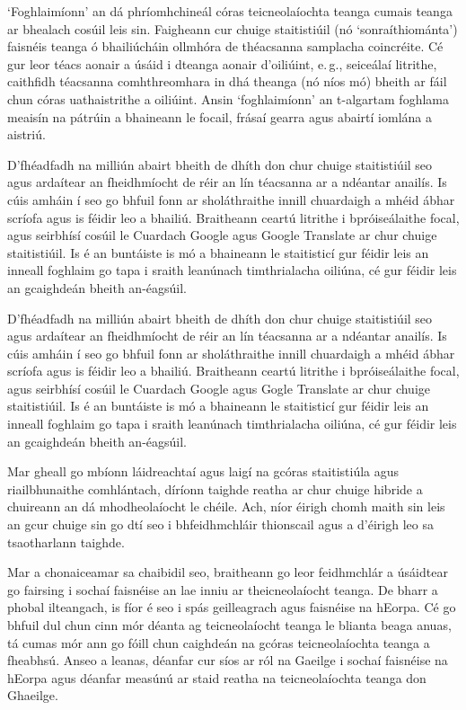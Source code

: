 \begin{multicols}{2}
`Foghlaimíonn' an dá phríomhchineál córas teicneolaíochta teanga cumais teanga ar bhealach cosúil leis sin. Faigheann cur chuige staitistiúil (nó ‘sonraíthiománta’) faisnéis teanga ó bhailiúcháin ollmhóra de théacsanna samplacha coincréite. Cé gur leor téacs aonair a úsáid i dteanga aonair d'oiliúint, e.\,g., seiceálaí litrithe, caithfidh téacsanna comhthreomhara in dhá theanga (nó níos mó) bheith ar fáil chun córas uathaistrithe a oiliúint. Ansin `foghlaimíonn' an t-algartam foghlama meaisín na pátrúin a bhaineann le focail, frásaí gearra agus abairtí iomlána a aistriú. 

D’fhéadfadh na milliún abairt bheith de dhíth don chur chuige staitistiúil seo agus ardaítear an fheidhmíocht de réir an lín téacsanna ar a ndéantar anailís. Is cúis amháin í seo go bhfuil fonn ar sholáthraithe innill chuardaigh a mhéid ábhar scríofa agus is féidir leo a bhailiú. Braitheann ceartú litrithe i bpróiseálaithe focal, agus seirbhísí cosúil le Cuardach Google agus Google Translate ar chur chuige staitistiúil. Is é an buntáiste is mó a bhaineann le staitisticí gur féidir leis an inneall foghlaim go tapa i sraith leanúnach timthrialacha oiliúna, cé gur féidir leis an gcaighdeán bheith an-éagsúil.

D’fhéadfadh na milliún abairt bheith de dhíth don chur chuige staitistiúil seo agus ardaítear an fheidhmíocht de réir an lín téacsanna ar a ndéantar anailís. Is cúis amháin í seo go bhfuil fonn ar sholáthraithe innill chuardaigh a mhéid ábhar scríofa agus is féidir leo a bhailiú. Braitheann ceartú litrithe i bpróiseálaithe focal, agus seirbhísí cosúil le Cuardach Google agus Gogle Translate ar chur chuige staitistiúil. Is é an buntáiste is mó a bhaineann le staitisticí gur féidir leis an inneall foghlaim go tapa i sraith leanúnach timthrialacha oiliúna, cé gur féidir leis an gcaighdeán bheith an-éagsúil. 

Mar gheall go mbíonn láidreachtaí agus laigí na gcóras staitistiúla agus riailbhunaithe comhlántach, díríonn taighde reatha ar chur chuige hibride a chuireann an dá mhodheolaíocht le chéile. Ach, níor éirigh chomh maith sin leis an gcur chuige sin go dtí seo i bhfeidhmchláir thionscail agus a d’éirigh leo sa tsaotharlann taighde. 

Mar a chonaiceamar sa chaibidil seo, braitheann go leor feidhmchlár a úsáidtear go fairsing i sochaí faisnéise an lae inniu ar theicneolaíocht teanga. De bharr a phobal ilteangach, is fíor é seo i spás geilleagrach agus faisnéise na hEorpa. Cé go bhfuil dul chun cinn mór déanta ag teicneolaíocht teanga le blianta beaga anuas, tá cumas mór ann go fóill chun caighdeán na gcóras teicneolaíochta teanga a fheabhsú. Anseo a leanas, déanfar cur síos ar ról na Gaeilge i sochaí faisnéise na hEorpa agus déanfar measúnú ar staid reatha na teicneolaíochta teanga don Ghaeilge.
\end{multicols}

